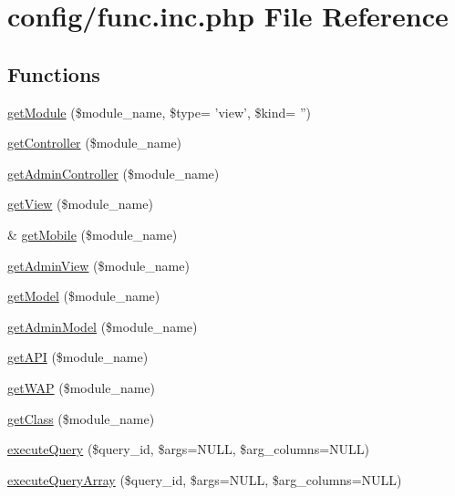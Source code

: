 \hypertarget{func_8inc_8php}{\section{config/func.inc.\-php File Reference}
\label{func_8inc_8php}
}
\subsection*{Functions}
\begin{DoxyCompactItemize}
\item 
\hyperlink{func_8inc_8php_ad4f68c32ca6c16b3a8619ac3462dc686}{get\-Module} (\$module\-\_\-name, \$type= 'view', \$kind= '')
\item 
\hyperlink{func_8inc_8php_aa08f01e3bf130d770b373ca8493e3e9b}{get\-Controller} (\$module\-\_\-name)
\item 
\hyperlink{func_8inc_8php_a2f7ca88a5226536aca3b2f5682bd7b2d}{get\-Admin\-Controller} (\$module\-\_\-name)
\item 
\hyperlink{func_8inc_8php_a49d537fc2c7b51ab5d7b7c6672b21ce3}{get\-View} (\$module\-\_\-name)
\item 
\& \hyperlink{func_8inc_8php_a26d3f423593da53eb90bb738aeed23ea}{get\-Mobile} (\$module\-\_\-name)
\item 
\hyperlink{func_8inc_8php_a194629ccc05f325c64834925b05d0941}{get\-Admin\-View} (\$module\-\_\-name)
\item 
\hyperlink{func_8inc_8php_aecdfcc5332bcf22df01fc21a03b64435}{get\-Model} (\$module\-\_\-name)
\item 
\hyperlink{func_8inc_8php_a902cd0c884e75afab2682fdd3ae3791f}{get\-Admin\-Model} (\$module\-\_\-name)
\item 
\hyperlink{func_8inc_8php_a12c822fc3e002eb1c58c58001db7ac88}{get\-A\-P\-I} (\$module\-\_\-name)
\item 
\hyperlink{func_8inc_8php_a0d8de97888953b480d02a9c9d845a64c}{get\-W\-A\-P} (\$module\-\_\-name)
\item 
\hyperlink{func_8inc_8php_a1d90f6abc9ca2d1a4500071159ebd4e7}{get\-Class} (\$module\-\_\-name)
\item 
\hyperlink{func_8inc_8php_a418bc23855eebc0d90190dd625ac4474}{execute\-Query} (\$query\-\_\-id, \$args=N\-U\-L\-L, \$arg\-\_\-columns=N\-U\-L\-L)
\item 
\hyperlink{func_8inc_8php_ace5cc06ee6c5d655a1bdcc15846a779e}{execute\-Query\-Array} (\$query\-\_\-id, \$args=N\-U\-L\-L, \$arg\-\_\-columns=N\-U\-L\-L)
\item 

\end{DoxyCompactItemize}
